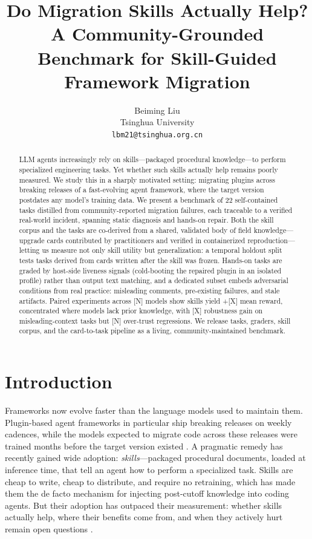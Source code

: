 \documentclass[11pt]{article}
\title{Do Migration Skills Actually Help? A Community-Grounded Benchmark for Skill-Guided Framework Migration}
\author{Beiming Liu \\
  Tsinghua University \\
  \texttt{lbm21@tsinghua.org.cn} \\}
\begin{document}
\maketitle
\begin{abstract}
LLM agents increasingly rely on skills---packaged procedural knowledge---to perform specialized engineering tasks.
Yet whether such skills actually help remains poorly measured.
We study this in a sharply motivated setting: migrating plugins across breaking releases of a fast-evolving agent framework, where the target version postdates any model's training data.
We present a benchmark of 22 self-contained tasks distilled from community-reported migration failures, each traceable to a verified real-world incident, spanning static diagnosis and hands-on repair.
Both the skill corpus and the tasks are co-derived from a shared, validated body of field knowledge---upgrade cards contributed by practitioners and verified in containerized reproduction---letting us measure not only skill utility but generalization: a temporal holdout split tests tasks derived from cards written after the skill was frozen.
Hands-on tasks are graded by host-side liveness signals (cold-booting the repaired plugin in an isolated profile) rather than output text matching, and a dedicated subset embeds adversarial conditions from real practice: misleading comments, pre-existing failures, and stale artifacts.
Paired experiments across [N] models show skills yield +[X] mean reward, concentrated where models lack prior knowledge, with [X] robustness gain on misleading-context tasks but [N] over-trust regressions.
We release tasks, graders, skill corpus, and the card-to-task pipeline as a living, community-maintained benchmark.
\end{abstract}

\section{Introduction}

Frameworks now evolve faster than the language models used to maintain them.
Plugin-based agent frameworks in particular ship breaking releases on weekly cadences, while the models expected to migrate code across these releases were trained months before the target version existed \citep{llmlag}.
A pragmatic remedy has recently gained wide adoption: \emph{skills}---packaged procedural documents, loaded at inference time, that tell an agent how to perform a specialized task.
Skills are cheap to write, cheap to distribute, and require no retraining, which has made them the de facto mechanism for injecting post-cutoff knowledge into coding agents.
But their adoption has outpaced their measurement: whether skills actually help, where their benefits come from, and when they actively hurt remain open questions \citep{skillsbench,skilluse,skillsharmful}.
\end{document}
